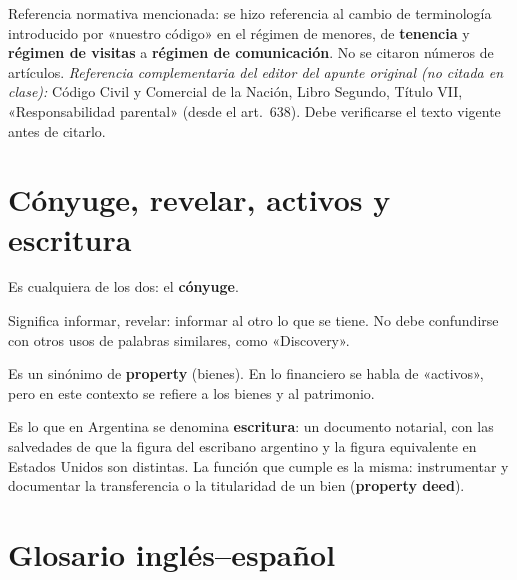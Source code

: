 \documentclass[12pt,oneside]{book}
\begin{document}
\begin{note}
Referencia normativa mencionada: se hizo referencia al cambio de terminología introducido por «nuestro código» en el régimen de menores, de \textbf{tenencia} y \textbf{régimen de visitas} a \textbf{régimen de comunicación}. No se citaron números de artículos. \textit{Referencia complementaria del editor del apunte original (no citada en clase):} Código Civil y Comercial de la Nación, Libro Segundo, Título VII, «Responsabilidad parental» (desde el art.~638). Debe verificarse el texto vigente antes de citarlo.
\end{note}

\section{Cónyuge, revelar, activos y escritura}

\begin{description}[leftmargin=1.5em,style=nextline]
    \item[\textbf{Spouse}] Es cualquiera de los dos: el \textbf{cónyuge}.
    \item[\textbf{Disclose}] Significa informar, revelar: informar al otro lo que se tiene. No debe confundirse con otros usos de palabras similares, como «Discovery».
    \item[\textbf{Assets}] Es un sinónimo de \textbf{property} (bienes). En lo financiero se habla de «activos», pero en este contexto se refiere a los bienes y al patrimonio.
    \item[\textbf{Deed}] Es lo que en Argentina se denomina \textbf{escritura}: un documento notarial, con las salvedades de que la figura del escribano argentino y la figura equivalente en Estados Unidos son distintas. La función que cumple es la misma: instrumentar y documentar la transferencia o la titularidad de un bien (\textbf{property deed}).
\end{description}

\section{Glosario inglés--español}
\end{document}
